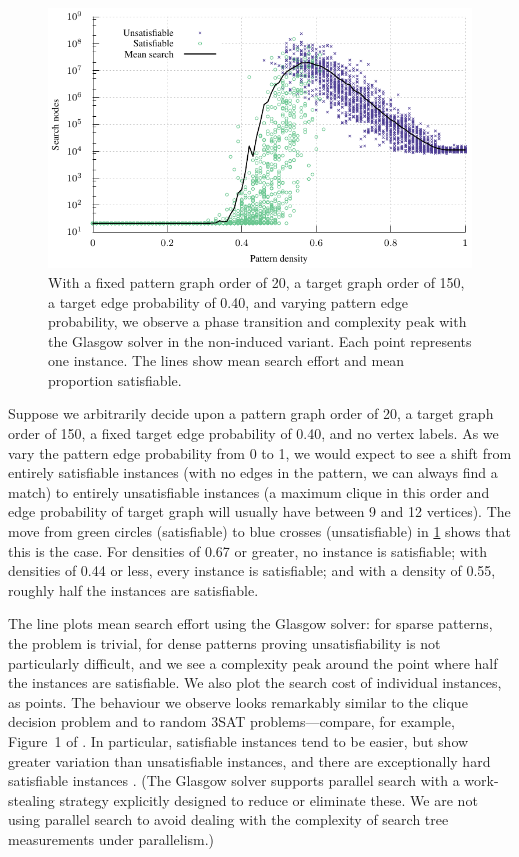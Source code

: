 \documentclass[twoside,11pt]{article}
\newcommand{\citet}[1]{\citeA{#1}}
\newcommand{\citep}[1]{\cite{#1}}
\begin{document}
\begin{figure}[t]
    \centering
    \includegraphics*{plots/phase-transition.pdf}

    \caption{With a fixed pattern graph order of 20, a target graph order of 150, a target edge
        probability of 0.40, and varying pattern edge probability, we observe a phase transition and
        complexity peak with the Glasgow solver in the non-induced variant. Each point represents
        one instance. The lines show mean search effort and mean proportion satisfiable.}
    \label{figure:phase-transition}
\end{figure}

Suppose we arbitrarily decide upon a pattern graph order of 20, a target graph order of 150, a fixed
target edge probability of 0.40, and no vertex labels. As we vary the pattern edge probability from
0 to 1, we would expect to see a shift from entirely satisfiable instances (with no edges in the
pattern, we can always find a match) to entirely unsatisfiable instances (a maximum clique in this
order and edge probability of target graph will usually have between 9 and 12 vertices). The move
from green circles (satisfiable) to blue crosses (unsatisfiable) in \cref{figure:phase-transition}
shows that this is the case. For densities of 0.67 or greater, no instance is satisfiable; with
densities of 0.44 or less, every instance is satisfiable; and with a density of 0.55, roughly half
the instances are satisfiable.

The line plots mean search effort using the Glasgow solver: for sparse patterns, the problem is
trivial, for dense patterns proving unsatisfiability is not particularly difficult, and we see a
complexity peak around the point where half the instances are satisfiable.  We also plot the search
cost of individual instances, as points. The behaviour we observe looks remarkably similar to the
clique decision problem and to random 3SAT problems---compare, for example,
Figure~1 of
\citet{DBLP:journals/cacm/Leyton-BrownHHX14}. In particular, satisfiable instances tend to be easier, but show greater
variation than unsatisfiable instances, and there are exceptionally hard satisfiable instances
\citep{DBLP:conf/cp/SmithG97}. (The Glasgow solver supports
parallel search with a work-stealing strategy explicitly designed to reduce or eliminate these. We
are not using parallel search to avoid dealing with the complexity of search tree
measurements under parallelism.)
\end{document}
